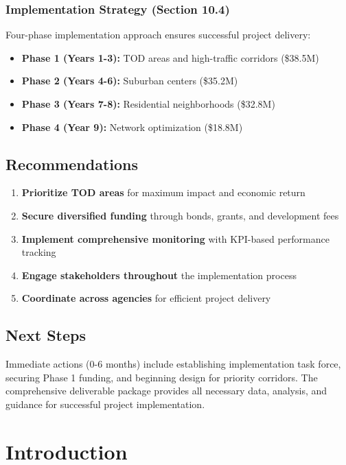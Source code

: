 \documentclass[11pt,letterpaper]{report}
\begin{document}
\subsection{Implementation Strategy (Section 10.4)}
Four-phase implementation approach ensures successful project delivery:
\begin{itemize}
    \item \textbf{Phase 1 (Years 1-3):} TOD areas and high-traffic corridors (\$38.5M)
    \item \textbf{Phase 2 (Years 4-6):} Suburban centers (\$35.2M)
    \item \textbf{Phase 3 (Years 7-8):} Residential neighborhoods (\$32.8M)
    \item \textbf{Phase 4 (Year 9):} Network optimization (\$18.8M)
\end{itemize}

\section{Recommendations}

\begin{enumerate}
    \item \textbf{Prioritize TOD areas} for maximum impact and economic return
    \item \textbf{Secure diversified funding} through bonds, grants, and development fees
    \item \textbf{Implement comprehensive monitoring} with KPI-based performance tracking
    \item \textbf{Engage stakeholders throughout} the implementation process
    \item \textbf{Coordinate across agencies} for efficient project delivery
\end{enumerate}

\section{Next Steps}

Immediate actions (0-6 months) include establishing implementation task force, securing Phase 1 funding, and beginning design for priority corridors. The comprehensive deliverable package provides all necessary data, analysis, and guidance for successful project implementation.

\chapter{Introduction}
\end{document}
